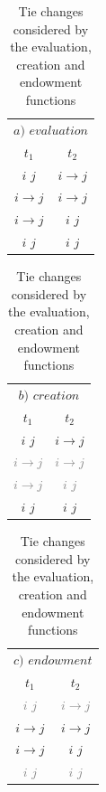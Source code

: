 \documentclass[a4paper,fleqn,11pt]{article}
\newcommand{\+}{\, + \,}
\begin{document}
\begin{table}[h]
\centering
	\caption{Tie changes considered by the evaluation, creation and endowment functions}
	\label{tab:TCece}
	\vspace{\baselineskip}
	\parbox{.30\linewidth}{
		\centering
		\begin{tabular}{c | c}
			\multicolumn{2}{c}{$a)$ $evaluation$}\\
			$t_{1}$ 				& $t_{2}$ 					 \\
			\hline
			\rowcolor{LimeGreen}
			$i$ \Fspace $j$ & $i \to j$ 				 \\
			\rowcolor{LimeGreen}
			$i  \to	j$			& $i \to j$ 				 \\
			\rowcolor{RoyalBlue}
			$i  \to	j$			& $i$ \Fspace $j$		 \\
			\rowcolor{RoyalBlue}
			$i$ \Fspace $j$	& $i$ \Fspace $j$		 \\
		\end{tabular}
	}
	\parbox{.30\linewidth}{
		\centering
		\begin{tabular}{c | c}
			\multicolumn{2}{c}{$b)$ $creation$}															\\
			$t_{1}$ 										& $t_{2}$ 												  \\
			\hline
			\rowcolor{LimeGreen}
			$i$ \Fspace $j$ 						& $i \to j$			  								  \\
			\textcolor{Grey}{$i \to j$} & \textcolor{Grey}{$i \to j$} 			\\
			\textcolor{Grey}{$i \to j$} & \textcolor{Grey}{$i$ \Fspace $j$} \\
			\rowcolor{RoyalBlue}
			$i$ \Fspace $j$							& $i$ \Fspace $j$ 								  \\
		\end{tabular}
	}
	\parbox{.30\linewidth}{
		\centering
		\begin{tabular}{c | c}
			\multicolumn{2}{c}{$c)$ $endowment$}																	\\
			$t_{1}$ 				& $t_{2}$ 																						\\
			\hline
			\textcolor{Grey}{$i$ \Fspace $j$} & \textcolor{Grey}{$i \to j$} 			\\
			\rowcolor{LimeGreen}
			$i \to j$													& $i \to j$ 												\\
			\rowcolor{RoyalBlue}
			$i \to j$													& $i$ \Fspace $j$ 									\\
			\textcolor{Grey}{$i$ \Fspace $j$}	& \textcolor{Grey}{$i$ \Fspace $j$} \\
		\end{tabular}
	}
\end{table}
\end{document}
